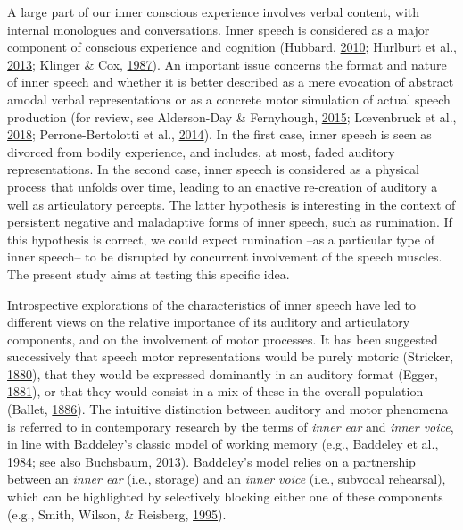 \documentclass[a4paper,12pt,twoside,openright,oldfontcommands]{memoir}
\begin{document}
A large part of our inner conscious experience involves verbal content, with internal monologues and conversations. Inner speech is considered as a major component of conscious experience and cognition (Hubbard, \protect\hyperlink{ref-hubbard_auditory_2010}{2010}; Hurlburt et al., \protect\hyperlink{ref-Hurlburt2013}{2013}; Klinger \& Cox, \protect\hyperlink{ref-klinger_dimensions_1987}{1987}). An important issue concerns the format and nature of inner speech and whether it is better described as a mere evocation of abstract amodal verbal representations or as a concrete motor simulation of actual speech production (for review, see Alderson-Day \& Fernyhough, \protect\hyperlink{ref-alderson-day_inner_2015}{2015}; Lœvenbruck et al., \protect\hyperlink{ref-loevenbruck_cognitive_2018}{2018}; Perrone-Bertolotti et al., \protect\hyperlink{ref-Perrone-Bertolotti2014}{2014}). In the first case, inner speech is seen as divorced from bodily experience, and includes, at most, faded auditory representations. In the second case, inner speech is considered as a physical process that unfolds over time, leading to an enactive re-creation of auditory a well as articulatory percepts. The latter hypothesis is interesting in the context of persistent negative and maladaptive forms of inner speech, such as rumination. If this hypothesis is correct, we could expect rumination --as a particular type of inner speech-- to be disrupted by concurrent involvement of the speech muscles. The present study aims at testing this specific idea.

Introspective explorations of the characteristics of inner speech have led to different views on the relative importance of its auditory and articulatory components, and on the involvement of motor processes. It has been suggested successively that speech motor representations would be purely motoric (Stricker, \protect\hyperlink{ref-stricker_studien_1880}{1880}), that they would be expressed dominantly in an auditory format (Egger, \protect\hyperlink{ref-egger_parole_1881}{1881}), or that they would consist in a mix of these in the overall population (Ballet, \protect\hyperlink{ref-ballet_langage_1886}{1886}). The intuitive distinction between auditory and motor phenomena is referred to in contemporary research by the terms of \emph{inner ear} and \emph{inner voice}, in line with Baddeley's classic model of working memory (e.g., Baddeley et al., \protect\hyperlink{ref-baddeley_exploring_1984}{1984}; see also Buchsbaum, \protect\hyperlink{ref-buchsbaum_role_2013}{2013}). Baddeley's model relies on a partnership between an \emph{inner ear} (i.e., storage) and an \emph{inner voice} (i.e., subvocal rehearsal), which can be highlighted by selectively blocking either one of these components (e.g., Smith, Wilson, \& Reisberg, \protect\hyperlink{ref-smith_role_1995}{1995}).
\end{document}
